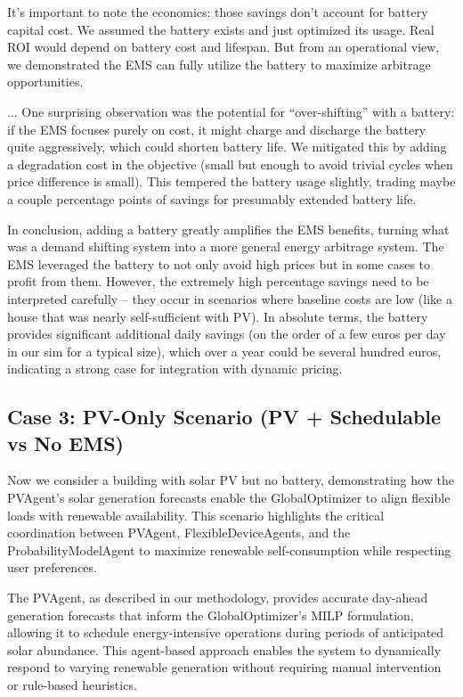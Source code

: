 \documentclass[12pt,a4paper]{article}
\begin{document}
It’s important to note the economics: those savings don’t account for battery capital cost. We assumed the battery exists and just optimized its usage. Real ROI would depend on battery cost and lifespan. But from an operational view, we demonstrated the EMS can fully utilize the battery to maximize arbitrage opportunities.

{{ ... }}
One surprising observation was the potential for “over-shifting” with a battery: if the EMS focuses purely on cost, it might charge and discharge the battery quite aggressively, which could shorten battery life. We mitigated this by adding a degradation cost in the objective (small but enough to avoid trivial cycles when price difference is small). This tempered the battery usage slightly, trading maybe a couple percentage points of savings for presumably extended battery life.

In conclusion, adding a battery greatly amplifies the EMS benefits, turning what was a demand shifting system into a more general energy arbitrage system. The EMS leveraged the battery to not only avoid high prices but in some cases to profit from them. However, the extremely high percentage savings need to be interpreted carefully – they occur in scenarios where baseline costs are low (like a house that was nearly self-sufficient with PV). In absolute terms, the battery provides significant additional daily savings (on the order of a few euros per day in our sim for a typical size), which over a year could be several hundred euros, indicating a strong case for integration with dynamic pricing.

\subsection{Case 3: PV-Only Scenario (PV + Schedulable vs No EMS)}
Now we consider a building with solar PV but no battery, demonstrating how the PVAgent's solar generation forecasts enable the GlobalOptimizer to align flexible loads with renewable availability. This scenario highlights the critical coordination between PVAgent, FlexibleDeviceAgents, and the ProbabilityModelAgent to maximize renewable self-consumption while respecting user preferences.

The PVAgent, as described in our methodology, provides accurate day-ahead generation forecasts that inform the GlobalOptimizer's MILP formulation, allowing it to schedule energy-intensive operations during periods of anticipated solar abundance. This agent-based approach enables the system to dynamically respond to varying renewable generation without requiring manual intervention or rule-based heuristics.
\end{document}
